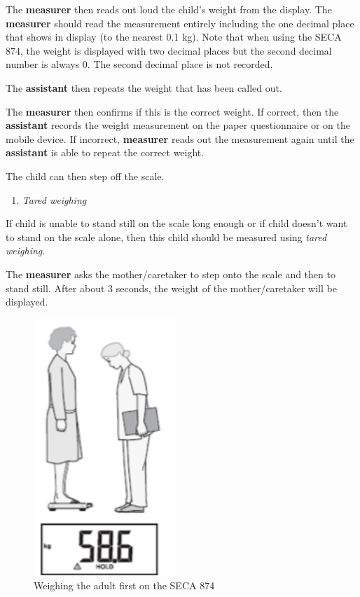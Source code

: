 \documentclass[
  12pt,
]{book}
\providecommand{\tightlist}{%
  \setlength{\itemsep}{0pt}\setlength{\parskip}{0pt}}
\begin{document}
The \textbf{measurer} then reads out loud the child's weight from the display. The \textbf{measurer} should read the measurement entirely including the one decimal place that shows in display (to the nearest 0.1 kg). Note that when using the SECA 874, the weight is displayed with two decimal places but the second decimal number is always 0. The second decimal place is not recorded.

The \textbf{assistant} then repeats the weight that has been called out.

The \textbf{measurer} then confirms if this is the correct weight. If correct, then the \textbf{assistant} records the weight measurement on the paper questionnaire or on the mobile device. If incorrect, \textbf{measurer} reads out the measurement again until the \textbf{assistant} is able to repeat the correct weight.

The child can then step off the scale.

\begin{enumerate}
\def\labelenumi{\alph{enumi}.}
\setcounter{enumi}{1}
\tightlist
\item
  \emph{Tared weighing}
\end{enumerate}

If child is unable to stand still on the scale long enough or if child doesn't want to stand on the scale alone, then this child should be measured using \emph{tared weighing}.

The \textbf{measurer} asks the mother/caretaker to step onto the scale and then to stand still. After about 3 seconds, the weight of the mother/caretaker will be displayed.

\begin{figure}

{\centering \includegraphics[width=2.11in]{images/seca874adult} 

}

\caption{Weighing the adult first on the SECA 874}\label{fig:weight9}
\end{figure}
\end{document}

